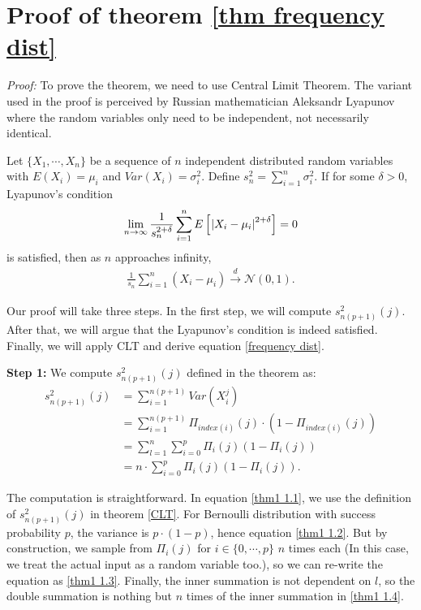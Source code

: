 \chapter{Proof of theorem \ref{thm frequency dist}} \label{proof of thm frequency dist}
\textit{Proof:} To prove the theorem, we need to use Central Limit Theorem. The variant used in the proof is perceived by Russian mathematician Aleksandr Lyapunov where the random variables only need to be independent, not necessarily identical.


\begin{theorem} \label{CLT}
Let $\{X_1, \cdots, X_n\}$ be a sequence of $n$ independent distributed random variables with $E(X_i) = \mu_i$ and $Var(X_i) = \sigma_i^2$. Define $s_n^2 = \sum_{i = 1}^{n} \sigma_i^2$. If for some $\delta > 0$, Lyapunov's condition \\
\begin{align*}
	\lim_{n \rightarrow \infty} \frac{1}{s_{n}^{2+\delta}} \sum_{i=1}^{n} E\left[\:\abs{X_i - \mu_i}^{2+\delta}\right] = 0
\end{align*}
is satisfied, then as $n$ approaches infinity,
\begin{align*}
	\frac{1}{s_n} \sum_{i=1}^{n} (X_i - \mu_i) \xrightarrow[]{d} \mathcal{N}(0, 1).
\end{align*}
\end{theorem}


Our proof will take three steps. In the first step, we will compute $s_{n(p+1)}^2(j)$. After that, we will argue that the Lyapunov's condition is indeed satisfied. Finally, we will apply CLT and derive equation \ref{frequency dist}.

\textbf{Step 1:} We compute $s_{n(p+1)}^2(j)$ defined in the theorem as:
\begin{align}
	s_{n(p+1)}^2(j) & = \sum_{i=1}^{n(p+1)} Var(X_i^j) \label{thm1 1.1} \\
		 		 	& = \sum_{i=1}^{n(p+1)} \Pi_{index(i)}(j) \cdot (1 - \Pi_{index(i)}(j)) \label{thm1 1.2} \\
		  		 	& = \sum_{l = 1}^{n} \sum_{i = 0}^{p} \Pi_i(j) (1 - \Pi_i(j))  \label{thm1 1.3}\\
		  		 	& = n \cdot \sum_{i = 0}^{p} \Pi_i(j) (1 - \Pi_i(j)) \label{thm1 1.4}.
\end{align}


The computation is straightforward. In equation \ref{thm1 1.1}, we use the definition of $s_{n(p+1)}^2(j)$ in theorem \ref{CLT}. For Bernoulli distribution with success probability $p$, the variance is $p \cdot (1 - p)$, hence equation \ref{thm1 1.2}. But by construction, we sample from $\Pi_i(j)$ for $i \in \{0, \cdots, p\}$ $n$ times each (In this case, we treat the actual input as a random variable too.), so we can re-write the equation as \ref{thm1 1.3}. Finally, the inner summation is not dependent on $l$, so the double summation is nothing but $n$ times of the inner summation in \ref{thm1 1.4}.



